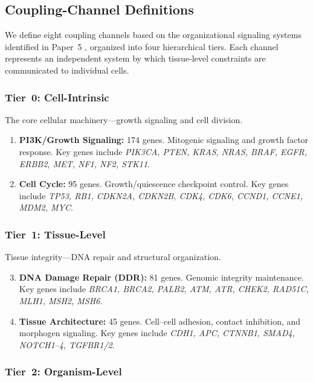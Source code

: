 \documentclass[11pt]{article}
\begin{document}
\subsection{Coupling-Channel Definitions}

We define eight coupling channels based on the organizational
signaling systems identified in Paper~5 \cite{McCarthy2026e},
organized into four hierarchical tiers. Each channel represents
an independent system by which tissue-level constraints are
communicated to individual cells.

\subsubsection{Tier~0: Cell-Intrinsic}

The core cellular machinery---growth signaling and cell division.

\begin{enumerate}
\item \textbf{PI3K/Growth Signaling:} 174 genes. Mitogenic
   signaling and growth factor response. Key genes include
   \emph{PIK3CA, PTEN, KRAS, NRAS, BRAF, EGFR, ERBB2, MET,
   NF1, NF2, STK11}.
\item \textbf{Cell Cycle:} 95 genes. Growth/quiescence
   checkpoint control. Key genes include \emph{TP53, RB1,
   CDKN2A, CDKN2B, CDK4, CDK6, CCND1, CCNE1, MDM2, MYC}.
\end{enumerate}

\subsubsection{Tier~1: Tissue-Level}

Tissue integrity---DNA repair and structural organization.

\begin{enumerate}
\setcounter{enumi}{2}
\item \textbf{DNA Damage Repair (DDR):} 81 genes. Genomic
   integrity maintenance. Key genes include \emph{BRCA1, BRCA2,
   PALB2, ATM, ATR, CHEK2, RAD51C, MLH1, MSH2, MSH6}.
\item \textbf{Tissue Architecture:} 45 genes. Cell--cell
   adhesion, contact inhibition, and morphogen signaling. Key
   genes include \emph{CDH1, APC, CTNNB1, SMAD4, NOTCH1--4,
   TGFBR1/2}.
\end{enumerate}

\subsubsection{Tier~2: Organism-Level}
\end{document}
